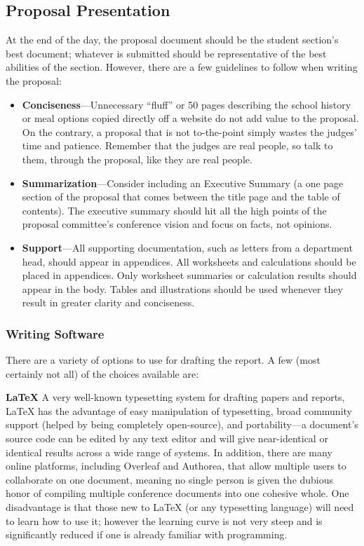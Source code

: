 \documentclass[12pt]{article}
\begin{document}
\subsection{Proposal Presentation}
At the end of the day, the proposal document should be the student section's best document; whatever is submitted should be representative of the best abilities of the section. However, there are a few guidelines to follow when writing the proposal:
\begin{itemize}
\item{\textbf{Conciseness}---Unnecessary ``fluff” or 50 pages describing the school history or meal options copied directly off a website do not add value to the proposal. On the contrary, a proposal that is not to-the-point simply wastes the judges’ time and patience. Remember that the judges
are real people, so talk to them, through the proposal, like they are real people.}

\item{\textbf{Summarization}---Consider including an Executive Summary (a one page section of the proposal that comes
between the title page and the table of contents). The executive summary should hit all
the high points of the proposal committee's conference vision and focus on facts, not opinions.}

\item{\textbf{Support}---All supporting documentation, such as letters from a department head, should appear in appendices. All worksheets and calculations should be placed in appendices. Only worksheet summaries or calculation results should appear in the body. Tables and illustrations should be used whenever they result in greater clarity and conciseness.}
\end{itemize}

\subsubsection{Writing Software}
There are a variety of options to use for drafting the report. 
A few (most certainly not all) of the choices available are:

\textbf{\LaTeX}\newline
A very well-known typesetting system for drafting papers and reports, LaTeX has the advantage of easy manipulation of typesetting, broad community support (helped by being completely open-source), and portability---a document's source code can be edited by any text editor and will give near-identical or identical results across a wide range of systems. In addition, there are many online platforms, including Overleaf and Authorea, that allow multiple users to collaborate on one document, meaning no single person is given the dubious honor of compiling multiple conference documents into one cohesive whole. One disadvantage is that those new to LaTeX (or any typesetting language) will need to learn how to use it; however the learning curve is not very steep and is significantly reduced if one is already familiar with programming.
\end{document}
